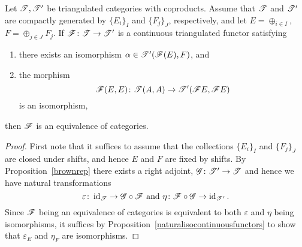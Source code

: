 \documentclass[dissertation.tex]{subfiles}
\begin{document}
\begin{cor}
  Let $\mathscr{T}, \mathscr{T}^\prime$ be triangulated categories with coproducts.
  Assume that $\mathscr{T}$ and $\mathscr{T}^\prime$ are compactly generated by $\{E_i\}_I$ and $\{F_j\}_J$, respectively, and let $E = \oplus_{i \in I}$, $F = \oplus_{j \in J} F_j$.
  If $\mathscr{F} \colon \mathscr{T} \to \mathscr{T}^\prime$ is a continuous triangulated functor satisfying
  \begin{enumerate}
  \item
    there exists an isomorphism $\alpha \in \mathscr{T}^\prime(\mathscr{F}(E), F)$, and
  \item
    the morphism
    $$\mathscr{F}(E,E) \colon \mathscr{T}(A,A) \to \mathscr{T}^\prime(\mathscr{F} E, \mathscr{F} E)$$
    is an isomorphism,
  \end{enumerate}
  then $\mathscr{F}$ is an equivalence of categories.

  \begin{proof}
    First note that it suffices to assume that the collections $\{E_i\}_I$ and $\{F_j\}_J$ are closed under shifts, and hence $E$ and $F$ are fixed by shifts.
    By Proposition~\ref{brownrep} there exists a right adjoint, $\mathscr{G} \colon \mathscr{T}^\prime \to \mathscr{T}$ and hence we have natural transformations
    $$\varepsilon \colon \id_{\T} \to \G \circ \F \ \text{and}\ \eta \colon \F \circ \G \to \id_{\T^\prime}.$$
    Since $\mathscr{F}$ being an equivalence of categories is equivalent to both $\varepsilon$ and $\eta$ being isomorphisms, it suffices by Proposition~\ref{naturalisocontinuousfunctors} to show that $\varepsilon_E$ and $\eta_F$ are isomorphisms.


\end{proof}
\end{cor}
\end{document}
